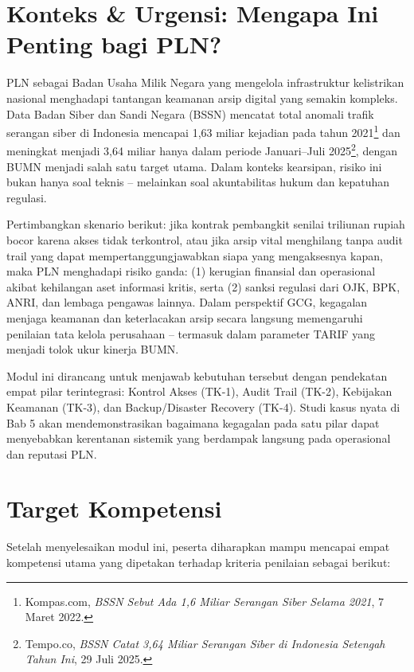 \documentclass[12pt,a4paper]{report}
\begin{document}
\section{Konteks \& Urgensi: Mengapa Ini Penting bagi PLN?}
PLN sebagai Badan Usaha Milik Negara yang mengelola infrastruktur kelistrikan nasional menghadapi tantangan keamanan arsip digital yang semakin kompleks. Data Badan Siber dan Sandi Negara (BSSN) mencatat total anomali trafik serangan siber di Indonesia mencapai 1,63 miliar kejadian pada tahun 2021\footnote{Kompas.com, \textit{BSSN Sebut Ada 1,6 Miliar Serangan Siber Selama 2021}, 7 Maret 2022.} dan meningkat menjadi 3,64 miliar hanya dalam periode Januari--Juli 2025\footnote{Tempo.co, \textit{BSSN Catat 3,64 Miliar Serangan Siber di Indonesia Setengah Tahun Ini}, 29 Juli 2025.}, dengan BUMN menjadi salah satu target utama. Dalam konteks kearsipan, risiko ini bukan hanya soal teknis -- melainkan soal akuntabilitas hukum dan kepatuhan regulasi.

Pertimbangkan skenario berikut: jika kontrak pembangkit senilai triliunan rupiah bocor karena akses tidak terkontrol, atau jika arsip vital menghilang tanpa audit trail yang dapat mempertanggungjawabkan siapa yang mengaksesnya kapan, maka PLN menghadapi risiko ganda: (1) kerugian finansial dan operasional akibat kehilangan aset informasi kritis, serta (2) sanksi regulasi dari OJK, BPK, ANRI, dan lembaga pengawas lainnya. Dalam perspektif GCG, kegagalan menjaga keamanan dan keterlacakan arsip secara langsung memengaruhi penilaian tata kelola perusahaan -- termasuk dalam parameter TARIF yang menjadi tolok ukur kinerja BUMN.

Modul ini dirancang untuk menjawab kebutuhan tersebut dengan pendekatan empat pilar terintegrasi: Kontrol Akses (TK-1), Audit Trail (TK-2), Kebijakan Keamanan (TK-3), dan Backup/Disaster Recovery (TK-4). Studi kasus nyata di Bab 5 akan mendemonstrasikan bagaimana kegagalan pada satu pilar dapat menyebabkan kerentanan sistemik yang berdampak langsung pada operasional dan reputasi PLN.

\section{Target Kompetensi}
Setelah menyelesaikan modul ini, peserta diharapkan mampu mencapai empat kompetensi utama yang dipetakan terhadap kriteria penilaian sebagai berikut:
\end{document}
